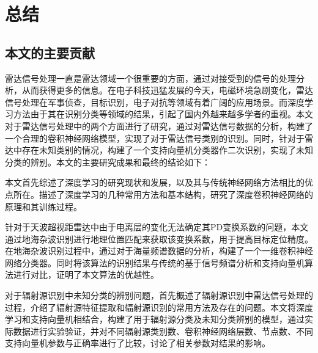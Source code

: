 \chapter{总结}
\section{本文的主要贡献}
雷达信号处理一直是雷达领域一个很重要的方面，通过对接受到的信号的处理分析，从而获得更多的信息。在电子科技迅猛发展的今天，电磁环境急剧变化，雷达信号处理在军事侦查，目标识别，电子对抗等领域有着广阔的应用场景。而深度学习方法由于其在识别分类等领域的结果，引起了国内外越来越多学者的重视。本文对于雷达信号处理中的两个方面进行了研究，通过对雷达信号数据的分析，构建了一个合理的卷积神经网络模型，实现了对于雷达信号类别的识别。同时，针对于雷达中存在未知类别的情况，构建了一个支持向量机分类器作二次识别，实现了未知分类的辨别。本文的主要研究成果和最终的结论如下：

本文首先综述了深度学习的研究现状和发展，以及其与传统神经网络方法相比的优点所在。描述了深度学习的几种常用方法和基本结构，研究了深度卷积神经网络的原理和其训练过程。

针对于天波超视距雷达中由于电离层的变化无法确定其PD变换系数的问题，本文通过地海杂波识别进行地理位置匹配来获取该变换系数，用于提高目标定位精度。在地海杂波识别过程中，通过对于海量频谱数据的分析，构建了一个一维卷积神经网络分类器。同时将该算法的识别结果与传统的基于信号频谱分析和支持向量机算法进行对比，证明了本文算法的优越性。

对于辐射源识别中未知分类的辨别问题，首先概述了辐射源识别中雷达信号处理的过程，介绍了辐射源特征提取和辐射源识别的常用方法及存在的问题。本文将深度学习和支持向量机相结合，构建了用于辐射源分类及未知分类辨别的模型，通过实际数据进行实验验证，并对不同辐射源类别数、卷积神经网络层数、节点数、不同支持向量机参数与正确率进行了比较，讨论了相关参数对结果的影响。 

